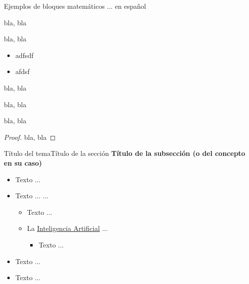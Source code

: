 \documentclass[10pt, envcountsect, presentation, aspectratio=43]{beamer}
\begin{document}
\begin{frame}{Ejemplos de bloques matemáticos}{ ... en español}

\begin{fact}[Evidencias]
	bla, bla
\end{fact}
	
	
\begin{definition}[Probabilidad]
	bla, bla
	
\begin{itemize}
\item adfsdf
\item afdsf
\end{itemize}


\end{definition}



\begin{lemma}
	bla, bla
\end{lemma}
		
\begin{theorem}
	bla, bla
\end{theorem}



\begin{corollary}[Es inmediato]
	bla, bla
\end{corollary}
	

\begin{proof}
	bla, bla
\end{proof}
\end{frame}







\begin{frame}{Título del tema}{Título de la sección}
\noindent\textbf{Título de la subsección (o del concepto en su caso)}
	\begin{itemize}
	\item Texto ...
	\item Texto ... \citep{Russell2020} ...
		\begin{itemize}
		\normalsize %
		\item[--] Texto ...
		\item[--] La \href{https://es.wikipedia.org/wiki/Inteligencia_artificial}{Inteligencia Artificial} ...
			\begin{itemize}
			\normalsize %
			\item[$\bullet$] Texto ...
			\end{itemize}	
			\end{itemize} 
	\item Texto ...		
	\item Texto ...
	\end{itemize}
\end{frame}
\end{document}
